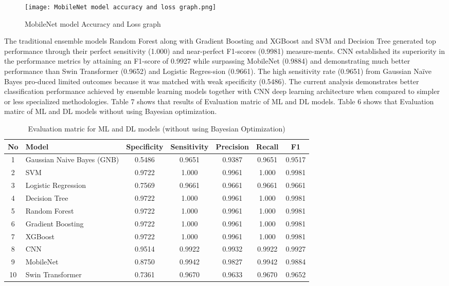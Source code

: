\documentclass[runningheads]{llncs}
\begin{document}
\begin{figure}
    \centering
    \texttt{[image: MobileNet model accuracy and loss graph.png]}
    \caption{MobileNet model Accuracy and Loss graph}
    \label{fig:enter-label}
\end{figure}



The traditional ensemble models Random Forest along with Gradient Boosting and XGBoost and SVM and Decision Tree generated top performance through their perfect sensitivity (1.000) and near-perfect F1-scores (0.9981) measure-ments. CNN established its superiority in the performance metrics by attaining an F1-score of 0.9927 while surpassing MobileNet (0.9884) and demonstrating much better performance than Swin Transformer (0.9652) and Logistic Regres-sion (0.9661). The high sensitivity rate (0.9651) from Gaussian Naïve Bayes pro-duced limited outcomes because it was matched with weak specificity (0.5486). The current analysis demonstrates better classification performance achieved by ensemble learning models together with CNN deep learning architecture when compared to simpler or less specialized methodologies. Table 7 shows that results of Evaluation matric of ML and DL models. Table 6 shows that Evaluation matirc of ML and DL models without using Bayesian optimization.

\begin{table}[ht]
\caption{Evaluation matric for ML and DL models (without using Bayesian Optimization)}
\centering
\begin{tabular}{|c|l|c|c|c|c|c|}
\hline
\textbf{No} & \textbf{Model} & \textbf{Specificity} & \textbf{Sensitivity} & \textbf{Precision} & \textbf{Recall} & \textbf{F1} \\
\hline
1 & Gaussian Naive Bayes (GNB) & 0.5486 & 0.9651 & 0.9387 & 0.9651 & 0.9517 \\
2 & SVM & 0.9722 & 1.000 & 0.9961 & 1.000 & 0.9981 \\
3 & Logistic Regression & 0.7569 & 0.9661 & 0.9661 & 0.9661 & 0.9661 \\
4 & Decision Tree & 0.9722 & 1.000 & 0.9961 & 1.000 & 0.9981 \\
5 & Random Forest & 0.9722 & 1.000 & 0.9961 & 1.000 & 0.9981 \\
6 & Gradient Boosting & 0.9722 & 1.000 & 0.9961 & 1.000 & 0.9981 \\
7 & XGBoost & 0.9722 & 1.000 & 0.9961 & 1.000 & 0.9981 \\
8 & CNN & 0.9514 & 0.9922 & 0.9932 & 0.9922 & 0.9927 \\
9 & MobileNet & 0.8750 & 0.9942 & 0.9827 & 0.9942 & 0.9884 \\
10 & Swin Transformer & 0.7361 & 0.9670 & 0.9633 & 0.9670 & 0.9652 \\
\hline
\end{tabular}

\label{tab:classification_metrics}
\end{table}
\end{document}
